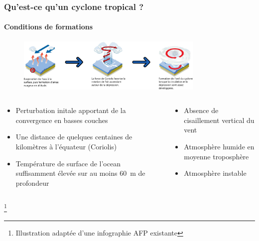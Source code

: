 \documentclass[aspectratio=169, usepdftitle=false, xcolor={dvipsnames}, 9pt,table]{beamer}
\newcommand\blfootnote[1]{%
  \begingroup
  \renewcommand\thefootnote{}\footnote{#1}%
  \addtocounter{footnote}{-1}%
  \endgroup
}
\begin{document}
\begin{frame}[c]
    \frametitle{Qu'est-ce qu'un cyclone tropical ?}
    \framesubtitle{Conditions de formations}
    \begin{figure}[h]
        \centering
        \includegraphics[width=0.8\textwidth]{Figures/diagramme_formation.png}
    \end{figure}
    \footnotesize
    \begin{block}
        \begin{columns}[t]
            \scriptsize
            \begin{column}{0.5\textwidth}
                \begin{itemize}
                   \item Perturbation initale apportant de la convergence en basses couches
                   \item Une distance de quelques centaines de kilomètres à l'équateur (Coriolis)
                   \item Température de surface de l'ocean suffisamment élevée \mbox{\parencite{palmen_formation_1948}} sur au moins 60~m de profondeur 
                \end{itemize}
            \end{column}
            \begin{column}{0.5\textwidth}
               \begin{itemize}
                   \item Absence de cisaillement vertical du vent\\\parencite{gray_global_1968}
                   \item Atmosphère humide en moyenne troposphère
                   \item Atmosphère instable
               \end{itemize} 
            \end{column}
        \end{columns}
    \end{block}
    \blfootnote{Illustration adaptée d'une infographie AFP existante}
\end{frame}
\end{document}
